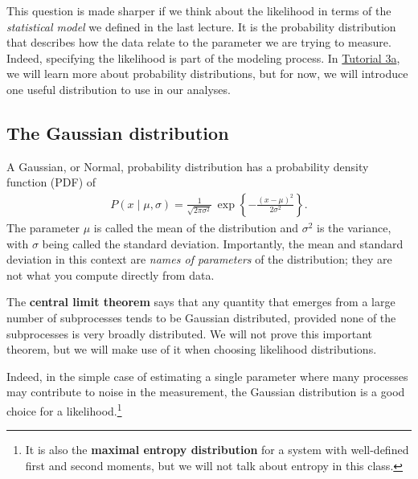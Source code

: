 This question is made sharper if we think about the likelihood in
terms of the \textit{statistical model} we defined in the last lecture.  It is the
probability distribution that describes how the data relate to the
parameter we are trying to measure. Indeed, specifying the likelihood is part of the modeling process. In \href{http://bebi103.caltech.edu/2016/tutorials/t3a_probability_distributions.html}{Tutorial 3a}, we will
learn more about probability distributions, but for now, we will
introduce one useful distribution to use in our analyses.

\subsection{The Gaussian distribution}
A Gaussian, or Normal, probability distribution has a probability
density function (PDF) of
\begin{align}
  P(x \mid \mu, \sigma) = \frac{1}{\sqrt{2\pi\sigma^2}}\,
\exp\left\{-\frac{(x - \mu)^2}{2\sigma^2}\right\}.
\end{align}
The parameter $\mu$ is called the mean of the distribution and
$\sigma^2$ is the variance, with $\sigma$ being called the standard
deviation. Importantly, the mean and standard deviation in this context are \textit{names of parameters} of the distribution; they are not what you compute directly from data.

The \textbf{central limit theorem} says that any quantity that emerges
from a large number of subprocesses tends to be Gaussian distributed,
provided none of the subprocesses is very broadly distributed.  We
will not prove this important theorem, but we will make use of it when
choosing likelihood distributions.

Indeed, in the simple case of estimating a single parameter where many
processes may contribute to noise in the measurement, the Gaussian
distribution is a good choice for a likelihood.\footnote{It is also the
  \textbf{maximal entropy distribution} for a system with well-defined
  first and second moments, but we will not talk about entropy in this
  class.}

